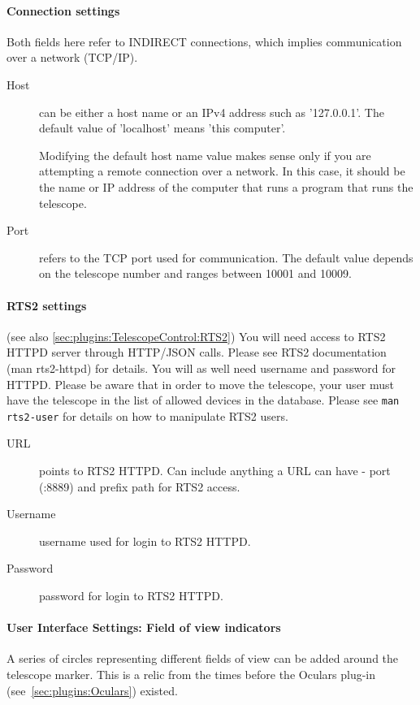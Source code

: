 \paragraph{Connection settings}
Both fields here refer to INDIRECT connections, which implies communication over a network (TCP/IP). 
\begin{description}
\item[Host] can be either a host name or an IPv4 address such as
  '127.0.0.1'.  The default value of 'localhost' means 'this
  computer'. 

  Modifying the default host name value makes sense only if you are
  attempting a remote connection over a network. In this case, it
  should be the name or IP address of the computer that runs a program
  that runs the telescope.
\item[Port] refers to the TCP port used for communication. The default
  value depends on the telescope number and ranges between 10001 and
  10009.
\end{description}

\paragraph{RTS2 settings} (see also \ref{sec:plugins:TelescopeControl:RTS2})
You will need access to RTS2 HTTPD server through HTTP/JSON calls.
Please see RTS2 documentation (man rts2-httpd) for details. You will as well need username
and password for HTTPD. Please be aware that in order to move the telescope,
your user must have the telescope in the list of allowed devices in the database. Please see \texttt{man
rts2-user} for details on how to manipulate RTS2 users.

\begin{description}
\item[URL] points to RTS2 HTTPD. Can include anything a URL can have - port
  (:8889) and prefix path for RTS2 access.
\item[Username] username used for login to RTS2 HTTPD.
\item[Password] password for login to RTS2 HTTPD.
\end{description}

\paragraph{User Interface Settings: Field of view indicators}

A series of circles representing different fields of view can be added
around the telescope marker. This is a relic from the times before the
Oculars plug-in (see~\ref{sec:plugins:Oculars}) existed.

